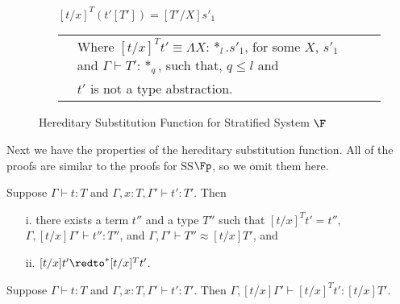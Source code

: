 \begin{figure}[t]
\begin{itemize}
    \item[] $[t/x]^{T} (t'[T']) = [T'/X]s'_1$\\
      \begin{tabular}{lll}
        & Where $[t/x]^{T} t' \equiv \Lambda X:*_l.s'_1$,
        for some $X$, $s'_1$ and $\Gamma \vdash T':*_q$, such that, $q \leq l$ and\\
	& $t'$ is not a type abstraction.
      \end{tabular}
  \end{itemize}
  \caption{Hereditary Substitution Function for Stratified System $\F$}
  \label{fig:hereditary_substitution_function_ssfe}
\end{figure}
Next we have the properties of the hereditary substitution function.
All of the proofs are similar to the proofs for SS$\Fp$, so we omit
them here.
\begin{lemma}
  \label{lemma:total_ssfe}
  Suppose $\Gamma \vdash t : T$ and $\Gamma, x:T, \Gamma' \vdash t':T'$.  Then
  \begin{itemize}
  \item[i.] there exists a term $t''$ and a type $T''$ such that $[t/x]^T t' = t''$, 
    $\Gamma,[t/x]\Gamma' \vdash t'':T''$, and $\Gamma,\Gamma' \vdash T'' \approx [t/x]T'$, and
  \item[ii.] $[t/x]t' \redto^* [t/x]^T t'$.
  \end{itemize}
\end{lemma}

\begin{corollary}
  \label{corollary:type_preserving_ssfe}
  Suppose $\Gamma \vdash t : T$ and $\Gamma, x:T, \Gamma' \vdash t':T'$. Then
  $\Gamma,[t/x]\Gamma' \vdash [t/x]^T t':[t/x]T'$.
\end{corollary}

